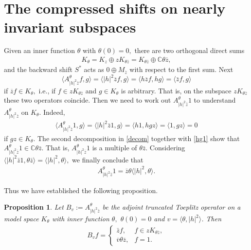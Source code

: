 \documentclass[12pt,reqno]{amsart}
\newtheorem{prop}[thm]{Proposition}
\theoremstyle{definition}
\theoremstyle{remark}
\numberwithin{equation}{section}
\newcommand{\la}{\langle}
\newcommand{\ra}{\rangle}
\newcommand{\ol}{\overline}
\begin{document}
\section{The compressed shifts on nearly invariant subspaces}

Given an inner function $\theta$ with $\theta(0)=0,$ there are two  orthogonal direct sums  \begin{align}K_\theta=K_z\oplus zK_{\theta\ol{z}}=K_{\theta\ol{z}}\oplus \mathbb{C}\theta\ol{z},\label{decom}\end{align}
and the backward shift $S^*$ acts as $0\oplus M_{\ol{z}}$ with respect to the first sum. Next $$\la A_{|h|^2\bar{z}}^\theta f, g\ra=\langle |h|^2\ol{z}f, g\rangle=\langle h\ol{z}f, hg\rangle=\langle \bar{z}f, g\rangle$$
if $\ol{z}f\in K_\theta,$ i.e., if $f\in zK_{\theta \bar{z}}$ and $g\in K_\theta$ is arbitrary. That is, on the subspace $zK_{\theta \bar{z}}$ these two operators coincide. Then we need to work out $A_{|h|^2\bar{z}}^\theta 1$ to understand $A_{|h|^2\bar{z}}^\theta$ on $K_\theta.$ Indeed,
\begin{align}\la A_{|h|^2\bar{z}}^\theta 1, g\ra= \langle |h|^2\bar{z}1, g\rangle=\langle h1, hgz\rangle=\langle 1, gz\rangle=0 \label{hg1}\end{align}
if $gz \in K_\theta.$ The second decomposition in \eqref{decom} together with \eqref{hg1}
show that    $A_{|h|^2 \bar{z}}^\theta 1 \in \mathbb{C}\theta {\bar z}$. That is, $A_{|h|^2 \bar{z}}^\theta 1$ is a multiple of $\theta \bar{z}$. Considering $\langle |h|^2\bar{z}1,\theta \bar{z}\rangle=\la |h|^2, \theta\ra,$ we finally conclude that
\begin{align} A_{|h|^2\bar{z}}^\theta 1=\bar{z}\theta \langle |h|^2, \theta\rangle.\label{AZ1} \end{align}

Thus we have established the following proposition.
\begin{prop}\label{Aztheta*} Let $B_v:=A_{|h|^2 \bar{z}}^\theta$ be the adjoint truncated Toeplitz operator on  a model space $K_\theta$ with  inner function $\theta,$ $\theta(0)=0$ and $v=\langle  \theta,|h|^2\rangle$. Then
 \begin{align}B_v f=\left\{ \begin{array}{ll}    \bar{z} f, &  f\in zK_{\theta \ol{z}}, \\ \ol{v}\theta \ol{z}, & f=1.  \end{array} \right.\label{AHZ*}\end{align}
 \end{prop}
\end{document}
